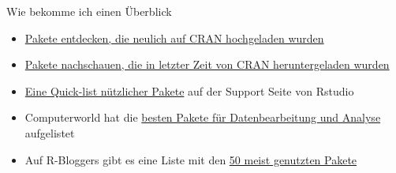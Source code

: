 \documentclass[ignorenonframetext,]{beamer}
\begin{document}
\begin{frame}{Wie bekomme ich einen Überblick}

\begin{itemize}
\item
  \href{https://mran.microsoft.com/packages/}{Pakete entdecken, die
  neulich auf CRAN hochgeladen wurden}
\item
  \href{https://gallery.shinyapps.io/cran-gauge/}{Pakete nachschauen,
  die in letzter Zeit von CRAN heruntergeladen wurden}
\item
  \href{https://support.rstudio.com/hc/en-us/articles/201057987-Quick-list-of-useful-R-packages}{Eine
  Quick-list nützlicher Pakete} auf der Support Seite von Rstudio
\item
  Computerworld hat die
  \href{http://www.computerworld.com/article/2921176/business-intelligence/great-r-packages-for-data-import-wrangling-visualization.html}{besten
  Pakete für Datenbearbeitung und Analyse} aufgelistet
\item
  Auf R-Bloggers gibt es eine Liste mit den
  \href{https://www.r-bloggers.com/the-50-most-used-r-packages/}{50
  meist genutzten Pakete}
\end{itemize}

\end{frame}
\end{document}
